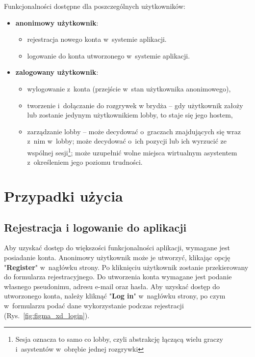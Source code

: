 Funkcjonalności dostępne dla poszczególnych użytkowników:
\begin{itemize}
    \item \textbf{anonimowy użytkownik}:
          \begin{itemize}
              \item rejestracja nowego konta w~systemie aplikacji.
              \item logowanie do konta utworzonego w~systemie aplikacji.
          \end{itemize}

    \item \textbf{zalogowany użytkownik}:
          \begin{itemize}
              \item wylogowanie z~konta (przejście w~stan użytkownika anonimowego),
              \item tworzenie i~dołączanie do rozgrywek w brydża --
                    gdy użytkownik założy lub zostanie jedynym
                    użytkownikiem lobby, to staje się jego
                    hostem,
              \item zarządzanie lobby -- może decydować o~graczach znajdujących się wraz
                    z~nim w~lobby; może decydować o~ich pozycji lub ich wyrzucić
                    ze wspólnej sesji\footnote{Sesja oznacza to samo co lobby, czyli
                        abstrakcję łączącą wielu graczy i~asystentów w~obrębie jednej
                        rozgrywki};
                    może uzupełnić wolne miejsca wirtualnym asystentem
                    z~określeniem jego poziomu trudności.
          \end{itemize}
\end{itemize}

\FloatBarrier

\section{Przypadki użycia}

\subsection{Rejestracja i logowanie do aplikacji}

Aby uzyskać dostęp do większości funkcjonalności aplikacji, wymagane
jest posiadanie konta. Anonimowy użytkownik może je utworzyć, klikając
opcję "\textbf{Register}"\xspace w~nagłówku strony. Po kliknięciu użytkownik
zostanie przekierowany do formularza rejestracyjnego.
Do utworzenia konta wymagane jest podanie własnego
pseudonimu, adresu e-mail oraz hasła. Aby uzyskać dostęp do utworzonego
konta, należy kliknąć "\textbf{Log in}"\xspace w~nagłówku strony, po czym
w~formularzu podać dane wykorzystanie podczas rejestracji (Rys.~\ref{fig:figma_xd_login}).

